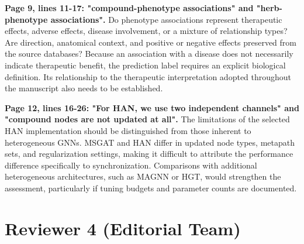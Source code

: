 \documentclass[11pt,american]{article}
\begin{document}
\begin{revresponse}

\end{revresponse}

\begin{revcomment}
\textbf{Page 9, lines 11-17: "compound-phenotype associations" and "herb-phenotype associations".} Do phenotype associations represent therapeutic effects, adverse effects, disease involvement, or a mixture of relationship types? Are direction, anatomical context, and positive or negative effects preserved from the source databases? Because an association with a disease does not necessarily indicate therapeutic benefit, the prediction label requires an explicit biological definition. Its relationship to the therapeutic interpretation adopted throughout the manuscript also needs to be established.
\end{revcomment}

\begin{revresponse}

\end{revresponse}

\begin{revcomment}
\textbf{Page 12, lines 16-26: "For HAN, we use two independent channels" and "compound nodes are not updated at all".} The limitations of the selected HAN implementation should be distinguished from those inherent to heterogeneous GNNs. MSGAT and HAN differ in updated node types, metapath sets, and regularization settings, making it difficult to attribute the performance difference specifically to synchronization. Comparisons with additional heterogeneous architectures, such as MAGNN or HGT, would strengthen the assessment, particularly if tuning budgets and parameter counts are documented.
\end{revcomment}

\begin{revresponse}

\end{revresponse}

\reviewer
\section*{\normalsize{Reviewer 4 (Editorial Team)}}
\end{document}
